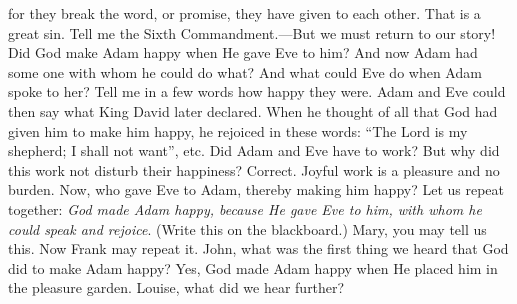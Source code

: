 for they break the word, or promise, they have given to each other. That is a great sin. Tell me the Sixth Commandment.—But we must return to our story! Did God make Adam happy when He gave Eve to him? And now Adam had some one with whom he could do what? And what could Eve do when Adam spoke to her? Tell me in a few words how happy they were. Adam and Eve could then say what King David later declared. When he thought of all that God had given him to make him happy, he rejoiced in these words: “The Lord is my shepherd; I shall not want”, etc. Did Adam and Eve have to work? But why did this work not disturb their happiness? Correct. Joyful work is a pleasure and no burden. Now, who gave Eve to Adam, thereby making him happy? Let us repeat together: \emph{God made Adam happy, because He gave Eve to him, with whom he could speak and rejoice}. (Write this on the blackboard.) Mary, you may tell us this. Now Frank may repeat it. John, what was the first thing we heard that God did to make Adam happy? Yes, God made Adam happy when He placed him in the pleasure garden. Louise, what did we hear further?

